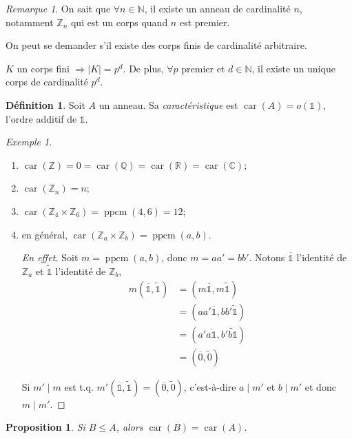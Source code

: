 \documentclass{report}
\newtheorem*{prop}{Proposition}
\theoremstyle{definition}
\newtheorem*{dfn}{D\'efinition}
\theoremstyle{remark}
\newtheorem*{exem}{Exemple}
\newtheorem*{rmq}{Remarque}
\def\lte{\leqslant}
\def\NN{\mathbb{N}}
\def\ZZ{\mathbb{Z}}
\def\QQ{\mathbb{Q}}
\def\RR{\mathbb{R}}
\def\CC{\mathbb{C}}
\def\id{\mathds{1}}
\newcommand*{\abs}[1]{\left|#1\right|}
\newcommand*{\caract}[1]{\operatorname{car}\left(#1\right)}
\begin{document}
	\begin{rmq}
		On sait que $\forall n\in\NN$, il existe un anneau de cardinalit\'e $n$, notamment $\ZZ_n$ qui est un corps quand $n$ est premier.

		On peut se demander s'il existe des corps finis de cardinalit\'e arbitraire.

		$K$ un corps fini $\Longrightarrow \abs{K}=p^d$. De plus, $\forall p$ premier et $d\in\NN$, il existe un unique corps de cardinalit\'e $p^d$.
	\end{rmq}

	\begin{dfn}
		Soit $A$ un anneau. Sa \emph{caract\'eristique} est $\caract{A} = o(\id)$, l'ordre additif de $\id$.
	\end{dfn}

	\begin{exem}
		\begin{enumerate}
			\item $\caract{\ZZ} = 0 = \caract{\QQ} = \caract{\RR} = \caract{\CC}$;
			\item $\caract{\ZZ_n}=n$;
			\item $\caract{\ZZ_4\times\ZZ_6} = \operatorname{ppcm}(4,6) = 12$;
			\item en g\'en\'eral, $\caract{\ZZ_a\times\ZZ_b} = \operatorname{ppcm}(a,b)$.
			\begin{proof}[En effet]
				Soit $m=\operatorname{ppcm}(a,b)$, donc $m=aa'=bb'$. Notons $\overline{\id}$ l'identit\'e de $\ZZ_a$ et $\widetilde{\id}$ l'identit\'e de $\ZZ_b$,
				\begin{align*}
					m(\overline{\id}, \widetilde{\id})&= (m\overline{\id}, m\widetilde{\id})\\
					&= (aa'\overline{\id}, bb'\widetilde{\id})\\
					&= (a'\overline{a\id}, b'\widetilde{b\id})\\
					&= (\overline{0}, \widetilde{0})
				\end{align*}

				Si $m' \mid m$ est t.q. $m'(\overline{\id}, \widetilde{\id}) = (\overline{0}, \widetilde{0})$, c'est-\`a-dire $a \mid m'$ et $b \mid m'$ et donc $m \mid m'$.
			\end{proof}
		\end{enumerate}
	\end{exem}

	\begin{prop}
		Si $B \lte A$, alors $\caract{B} = \caract{A}$.
	\end{prop}
\end{document}
